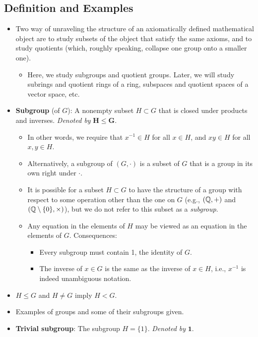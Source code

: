 \documentclass[../notes.tex]{subfiles}
\begin{document}
\subsection*{Definition and Examples}
\begin{itemize}
    \item Two way of unraveling the structure of an axiomatically defined mathematical object are to study subsets of the object that satisfy the same axioms, and to study quotients (which, roughly speaking, collapse one group onto a smaller one).
    \begin{itemize}
        \item Here, we study subgroups and quotient groups. Later, we will study subrings and quotient rings of a ring, subspaces and quotient spaces of a vector space, etc.
    \end{itemize}
    \item \textbf{Subgroup} (of $G$): A nonempty subset $H\subset G$ that is closed under products and inverses. \emph{Denoted by} $\bm{H\leq G}$.
    \begin{itemize}
        \item In other words, we require that $x^{-1}\in H$ for all $x\in H$, and $xy\in H$ for all $x,y\in H$.
        \item Alternatively, a subgroup of $(G,\cdot)$ is a subset of $G$ that is a group in its own right under $\cdot$.
        \item It is possible for a subset $H\subset G$ to have the structure of a group with respect to some operation other than the one on $G$ (e.g., $(\mathbb{Q},+)$ and $(\mathbb{Q}\setminus\{0\},\times)$), but we do not refer to this subset as a \emph{subgroup}.
        \item Any equation in the elements of $H$ may be viewed as an equation in the elements of $G$. Consequences:
        \begin{itemize}
            \item Every subgroup must contain 1, the identity of $G$.
            \item The inverse of $x\in G$ is the same as the inverse of $x\in H$, i.e., $x^{-1}$ is indeed unambiguous notation.
        \end{itemize}
    \end{itemize}
    \item $H\leq G$ and $H\neq G$ imply $H<G$.
    \item Examples of groups and some of their subgroups given.
    \item \textbf{Trivial subgroup}: The subgroup $H=\{1\}$. \emph{Denoted by} $\bm{1}$.

\end{itemize}
\end{document}
